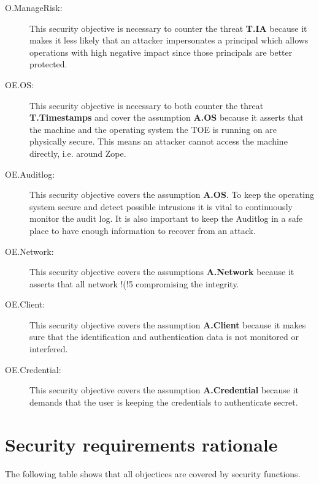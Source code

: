 \documentclass[12pt,english]{scrbook}
\begin{document}
\begin{description}
  \item[O.ManageRisk:] This security objective is necessary to counter the
  threat \textbf{T.IA} because it makes it less likely that an attacker
  impersonates a principal which allows operations with high negative impact
  since those principals are better protected.

  \item[OE.OS:] This security objective is necessary to both counter the
  threat \textbf{T.Timestamps} and cover the assumption \textbf{A.OS} because
  it asserts that the machine and the operating system the TOE is running on
  are physically secure. This means an attacker cannot access the machine
  directly, i.e. around Zope.

  \item[OE.Auditlog:] This security objective covers the assumption
  \textbf{A.OS}. To keep the operating system secure and detect possible
  intrusions it is vital to continuously monitor the audit log. It is also
  important to keep the Auditlog in a safe place to have enough information to
  recover from an attack.

  \item[OE.Network:] This security objective covers the assumptions
  \textbf{A.Network} because it asserts that all
  network !(!5
  compromising the integrity.

  \item[OE.Client:] This security objective covers the assumption
  \textbf{A.Client} because it makes sure that the identification and
  authentication data is not monitored or interfered.

  \item[OE.Credential:] This security objective covers the assumption
  \textbf{A.Credential} because it demands that the user is keeping the
  credentials to authenticate secret.
  
\end{description}



\section{Security requirements rationale}

The following table shows that all objectices are covered by security
functions.
\end{document}
